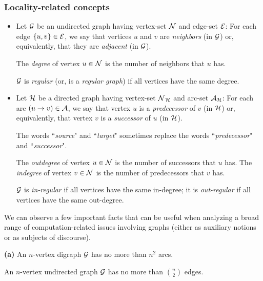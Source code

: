 \subsubsection{Locality-related concepts}

\begin{itemize}
\item
Let $\mbox{$\cal G$}$ be an undirected graph having vertex-set $\mbox{$\cal N$}$ and edge-set $\mbox{$\cal E$}$:   For each edge $\{u,v\} \in \mbox{$\cal E$}$, we say that vertices $u$ and $v$ are {\it neighbors} (in $\mbox{$\cal G$}$) or, equivalently, that they are {\it adjacent} (in $\mbox{$\cal G$}$).

\smallskip

The {\it degree} of vertex $u \in \mbox{$\cal N$}$ is the number of neighbors that $u$ has.

\smallskip

$\mbox{$\cal G$}$ is {\it regular} (or, is a {\it regular graph}) if all vertices have the same degree.

\medskip\item
Let $\mbox{$\cal H$}$ be a directed graph having vertex-set $\mbox{$\cal N$}_{\mbox{{\scriptsize $\cal H$}}}$ and arc-set $\mbox{$\cal A$}_{\mbox{{\scriptsize $\cal H$}}}$:   For each arc $(u \rightarrow v) \in \mbox{$\cal A$}$, we say that vertex $u$ is a {\it predecessor} of $v$ (in $\mbox{$\cal H$}$) or, equivalently, that vertex $v$ is a {\it successor} of $u$ (in $\mbox{$\cal H$}$).

\smallskip
 
The words ``{\it source}" and ``{\it target}" sometimes replace the words ``{\it predecessor}"  and ``{\it successor}".

\smallskip

The {\it outdegree} of vertex $u \in \mbox{$\cal N$}$ is the number of successors that $u$ has.  The {\it indegree} of vertex $v \in \mbox{$\cal N$}$ is the number of predecessors that $v$ has.

\smallskip

$\mbox{$\cal G$}$ is {\it in-regular} if all vertices have the same in-degree; it is {\it out-regular} if all vertices have the same out-degree.
\end{itemize}

\bigskip

We can observe a few important facts that can be useful when analyzing a broad range of
computation-related issues involving graphs (either as auxiliary notions or as subjects of discourse).

\begin{prop}
\label{thm:number-edges/arcs}
{\bf (a)}
An $n$-vertex digraph $\mbox{$\cal G$}$ has no more than $n^2$ arcs.

An $n$-vertex undirected graph $\mbox{$\cal G$}$ has no more than $\displaystyle {n \choose 2}$ edges.
\end{prop}

